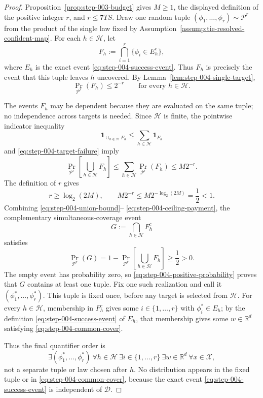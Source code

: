 \begin{proof}
Proposition~\ref{prop:step-003-budget} gives $M\geq1$, the displayed
definition of the positive integer $r$, and $r\leq7TS$.  Draw one random
tuple $(\phi_1,\ldots,\phi_r)\sim\mathcal P^r$ from the product of the
single law fixed by Assumption~\ref{assump:tie-resolved-confident-map}.  For
each $h\in\mathcal H$, let
\begin{equation}
F_h:=\bigcap_{i=1}^{r}\{\phi_i\in E_h^c\},
\label{eq:step-004-uncovered-event}
\end{equation}
where $E_h$ is the exact event \eqref{eq:step-004-success-event}.  Thus $F_h$
is precisely the event that this tuple leaves $h$ uncovered.  By
Lemma~\ref{lem:step-004-single-target},
\begin{equation}
\Pr_{\mathcal P^r}(F_h)\leq2^{-r}
\qquad\text{for every }h\in\mathcal H.
\label{eq:step-004-target-failure}
\end{equation}

The events $F_h$ may be dependent because they are evaluated on the same
tuple; no independence across targets is needed.  Since $\mathcal H$ is
finite, the pointwise indicator inequality
\[
\mathbf 1_{\cup_{h\in\mathcal H}F_h}
\leq\sum_{h\in\mathcal H}\mathbf 1_{F_h}
\]
and \eqref{eq:step-004-target-failure} imply
\begin{equation}
\Pr_{\mathcal P^r}\!\left[\bigcup_{h\in\mathcal H}F_h\right]
\leq\sum_{h\in\mathcal H}\Pr_{\mathcal P^r}(F_h)
\leq M2^{-r}.
\label{eq:step-004-union-bound}
\end{equation}
The definition of $r$ gives
\begin{equation}
r\geq\log_2(2M),
\qquad
M2^{-r}\leq M2^{-\log_2(2M)}=\frac12<1.
\label{eq:step-004-ceiling-payment}
\end{equation}
Combining \eqref{eq:step-004-union-bound}--
\eqref{eq:step-004-ceiling-payment}, the complementary simultaneous-coverage
event
\[
G:=\bigcap_{h\in\mathcal H}F_h^c
\]
satisfies
\begin{equation}
\Pr_{\mathcal P^r}(G)
=1-\Pr_{\mathcal P^r}\!\left[\bigcup_{h\in\mathcal H}F_h\right]
\geq\frac12>0.
\label{eq:step-004-positive-probability}
\end{equation}
The empty event has probability zero, so
\eqref{eq:step-004-positive-probability} proves that $G$ contains at least one
tuple.  Fix one such realization and call it
$(\phi_1^*,\ldots,\phi_r^*)$.  This tuple is fixed once, before any target is
selected from $\mathcal H$.  For every $h\in\mathcal H$, membership in
$F_h^c$ gives some $i\in\{1,\ldots,r\}$ with $\phi_i^*\in E_h$; by the
definition \eqref{eq:step-004-success-event} of $E_h$, that membership gives
some $w\in\mathbb R^d$ satisfying \eqref{eq:step-004-common-cover}.

Thus the final quantifier order is
\[
\exists(\phi_1^*,\ldots,\phi_r^*)\ \forall h\in\mathcal H\
\exists i\in\{1,\ldots,r\}\ \exists w\in\mathbb R^d\
\forall x\in\mathcal X,
\]
not a separate tuple or law chosen after $h$.  No distribution appears in the
fixed tuple or in \eqref{eq:step-004-common-cover}, because the exact event
\eqref{eq:step-004-success-event} is independent of $\mathcal D$.
\end{proof}

